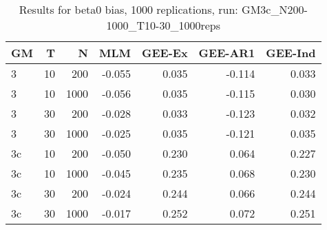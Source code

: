 \begin{table}[ht]
\centering
\begin{tabular}{lrrrrrr}
  \hline
GM & T & N & MLM & GEE-Ex & GEE-AR1 & GEE-Ind \\ 
  \hline
3 & 10 & 200 & -0.055 & 0.035 & -0.114 & 0.033 \\ 
  3 & 10 & 1000 & -0.056 & 0.035 & -0.115 & 0.030 \\ 
  3 & 30 & 200 & -0.028 & 0.033 & -0.123 & 0.032 \\ 
  3 & 30 & 1000 & -0.025 & 0.035 & -0.121 & 0.035 \\ 
  3c & 10 & 200 & -0.050 & 0.230 & 0.064 & 0.227 \\ 
  3c & 10 & 1000 & -0.045 & 0.235 & 0.068 & 0.230 \\ 
   \hline
3c & 30 & 200 & -0.024 & 0.244 & 0.066 & 0.244 \\ 
  3c & 30 & 1000 & -0.017 & 0.252 & 0.072 & 0.251 \\ 
  \end{tabular}
\caption{Results for beta0 bias, 1000 replications, run: GM3c_N200-1000_T10-30_1000reps} 
\label{tab:beta0_bias}
\end{table}
